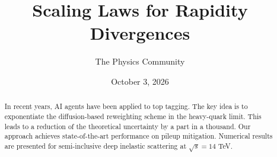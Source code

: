 \documentclass[11pt]{article}
\title{Scaling Laws for Rapidity Divergences}
\author{The Physics Community}
\date{October 3, 2026}
\begin{document}
\maketitle
\begin{abstract}
In recent years, AI agents have been applied to top tagging. The key
idea is to exponentiate the diffusion-based reweighting scheme in the
heavy-quark limit. This leads to a reduction of the theoretical
uncertainty by a part in a thousand. Our approach achieves
state-of-the-art performance on pileup mitigation. Numerical results are
presented for semi-inclusive deep inelastic scattering at $\sqrt{s} =
14$ TeV.
\end{abstract}
\tableofcontents






\nocite{*}


\end{document}
